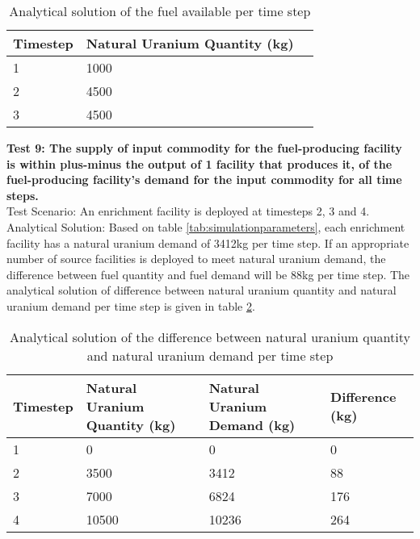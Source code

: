 \documentclass[12pt,letterpaper]{article}
\begin{document}
\begin{table}[H]
     \centering
    \begin{tabularx}{\textwidth}{bbb}
       \hline
       Timestep & Natural Uranium Quantity (kg)  \\
       \hline
       1 & 1000 \\
       2 & 4500 \\
       3 & 4500\\
       \hline
    \end{tabularx}
    \caption {Analytical solution of the fuel available per time step}
    \label{tab:test-NUdemand2}
\end{table}

\noindent
\textbf{Test 9: The supply of input commodity for the fuel-producing facility is within plus-minus the output of 1 facility that produces it, of the fuel-producing facility's demand for the input commodity for all time steps.} \\
Test Scenario: An enrichment facility is deployed at timesteps 2, 3 and 4.\\
Analytical Solution: Based on table \ref{tab:simulationparameters}, each enrichment facility has a natural uranium demand of 3412kg per time step. If an appropriate number of source facilities is deployed to meet natural uranium demand, the difference between fuel quantity and fuel demand will be 88kg per time step. The analytical solution of difference between natural uranium quantity and natural uranium demand per time step is given in table \ref{tab:test-NUdiff}.  

\begin{table}[H]
     \centering
    \begin{tabularx}{\textwidth}{bbbb}
       \hline
       Timestep & Natural Uranium Quantity (kg) & Natural Uranium Demand (kg) & Difference (kg)\\
       \hline
       1 & 0 & 0 & 0\\
       2 & 3500 & 3412 & 88\\
       3 &  7000 & 6824 & 176\\
       4 & 10500 & 10236 & 264\\
       \hline
    \end{tabularx}
    \caption {Analytical solution of the difference between natural uranium  quantity and natural uranium demand per time step}
    \label{tab:test-NUdiff}
\end{table}
\end{document}
